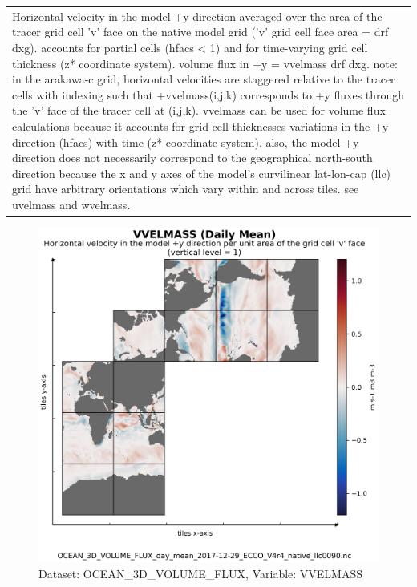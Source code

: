 \begin{longtable}{|m{}|m{}|m{}|m{}|}
\rowcolor{lightgray} \multicolumn{4}{|c|}{\textbf{Comments}} \\ \hline
\multicolumn{4}{|p{1\textwidth}|}{\footnotesize{{Horizontal velocity in the model +y direction averaged over the area of the tracer grid cell 'v' face on the native model grid ('v' grid cell face area = drf dxg). accounts for partial cells (hfacs < 1) and for time-varying grid cell thickness (z* coordinate system). volume flux in +y = vvelmass drf dxg. note: in the arakawa-c grid, horizontal velocities are staggered relative to the tracer cells with indexing such that +vvelmass(i,j,k) corresponds to +y fluxes through the 'v' face of the tracer cell at (i,j,k). vvelmass can be used for volume flux calculations because it accounts for grid cell thicknesses variations in the +y direction (hfacs) with time (z* coordinate system). also, the model +y direction does not necessarily correspond to the geographical north-south direction because the x and y axes of the model's curvilinear lat-lon-cap (llc) grid have arbitrary orientations which vary within and across tiles. see uvelmass and wvelmass.}}} \\ \hline
\end{longtable}

\begin{figure}[H]
\centering
\includegraphics[scale=0.55]{../images/plots/v4r4/native_plots/Ocean_Three-Dimensional_Volume_Fluxes/VVELMASS.png}
\caption{Dataset: OCEAN\_3D\_VOLUME\_FLUX, Variable: VVELMASS}
\label{tab:table-OCEAN_3D_VOLUME_FLUX_VVELMASS-Plot}
\end{figure}
\newpage
\pagebreak
